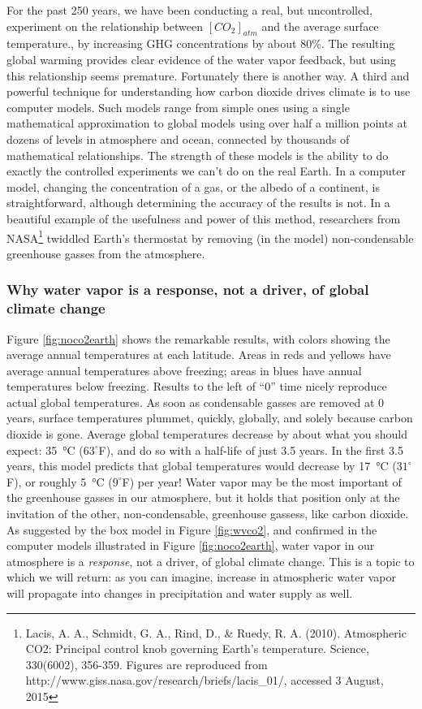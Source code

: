 \documentclass[amstex,12pt]{book}
\begin{document}
For the past 250 years, we have been conducting a real, but uncontrolled, experiment on the relationship between $[CO_2]_{atm}$ and the average surface temperature., by increasing GHG concentrations by about 80\%. The resulting global warming provides clear evidence of the water vapor feedback, but using this relationship seems premature. Fortunately there is another way. A third and powerful technique for understanding how carbon dioxide drives climate is to use computer models. Such models range from simple ones using a single mathematical approximation to global models using over half a million points at dozens of levels in atmosphere and ocean, connected by thousands of mathematical relationships. The strength of these models is the ability to do exactly the controlled experiments we can't do on the real Earth. In a computer model, changing the concentration of a gas, or the albedo of a continent, is straightforward, although determining the accuracy of the results is not. In a beautiful example of the usefulness and power of this method, researchers from NASA\footnote{Lacis, A. A., Schmidt, G. A., Rind, D., \& Ruedy, R. A. (2010). Atmospheric CO2: Principal control knob governing Earth's temperature. Science, 330(6002), 356-359. Figures are reproduced from http://www.giss.nasa.gov/research/briefs/lacis\_01/, accessed 3 August, 2015} twiddled Earth's thermostat by removing (in the model) non-condensable greenhouse gasses from the atmosphere. 

\subsubsection{Why water vapor is a response, not a driver, of global climate change}
Figure \ref{fig:noco2earth} shows the remarkable results, with colors showing the average annual temperatures at each latitude. Areas in reds and yellows have average annual temperatures above freezing; areas in blues have annual temperatures below freezing. Results to the left of ``0'' time nicely reproduce actual global temperatures.  As soon as condensable gasses are removed at 0 years, surface temperatures plummet, quickly, globally, and solely because carbon dioxide is gone. Average global temperatures decrease by about what you should expect: \SI{35}{\celsius} ($63^{\circ}$F), and do so with a half-life of just 3.5 years. In the first 3.5 years, this model predicts that global temperatures would decrease by \SI{17}{\celsius} ($31^{\circ}$F), or roughly \SI{5}{\celsius} ($9^{\circ}$F) per year! Water vapor may be the most important of the greenhouse gasses in our atmosphere, but it holds that position only at the invitation of the other, non-condensable, greenhouse gassess, like carbon dioxide. As suggested by the box model in Figure \ref{fig:wvco2}, and confirmed in the computer models illustrated in Figure \ref{fig:noco2earth}, water vapor in our atmosphere is a \emph{response}, not a driver, of global climate change. This is a topic to which we will return: as you can imagine, increase in atmospheric water vapor will propagate into changes in precipitation and water supply as well. 
\end{document}
